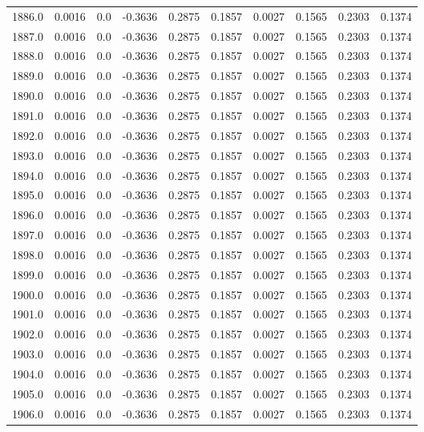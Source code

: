 \begin{longtable}{lrrrrrrrrr}
1886.0 & 0.0016 & 0.0 & -0.3636 & 0.2875 & 0.1857 & 0.0027 & 0.1565 & 0.2303 & 0.1374 \\
1887.0 & 0.0016 & 0.0 & -0.3636 & 0.2875 & 0.1857 & 0.0027 & 0.1565 & 0.2303 & 0.1374 \\
1888.0 & 0.0016 & 0.0 & -0.3636 & 0.2875 & 0.1857 & 0.0027 & 0.1565 & 0.2303 & 0.1374 \\
1889.0 & 0.0016 & 0.0 & -0.3636 & 0.2875 & 0.1857 & 0.0027 & 0.1565 & 0.2303 & 0.1374 \\
1890.0 & 0.0016 & 0.0 & -0.3636 & 0.2875 & 0.1857 & 0.0027 & 0.1565 & 0.2303 & 0.1374 \\
1891.0 & 0.0016 & 0.0 & -0.3636 & 0.2875 & 0.1857 & 0.0027 & 0.1565 & 0.2303 & 0.1374 \\
1892.0 & 0.0016 & 0.0 & -0.3636 & 0.2875 & 0.1857 & 0.0027 & 0.1565 & 0.2303 & 0.1374 \\
1893.0 & 0.0016 & 0.0 & -0.3636 & 0.2875 & 0.1857 & 0.0027 & 0.1565 & 0.2303 & 0.1374 \\
1894.0 & 0.0016 & 0.0 & -0.3636 & 0.2875 & 0.1857 & 0.0027 & 0.1565 & 0.2303 & 0.1374 \\
1895.0 & 0.0016 & 0.0 & -0.3636 & 0.2875 & 0.1857 & 0.0027 & 0.1565 & 0.2303 & 0.1374 \\
1896.0 & 0.0016 & 0.0 & -0.3636 & 0.2875 & 0.1857 & 0.0027 & 0.1565 & 0.2303 & 0.1374 \\
1897.0 & 0.0016 & 0.0 & -0.3636 & 0.2875 & 0.1857 & 0.0027 & 0.1565 & 0.2303 & 0.1374 \\
1898.0 & 0.0016 & 0.0 & -0.3636 & 0.2875 & 0.1857 & 0.0027 & 0.1565 & 0.2303 & 0.1374 \\
1899.0 & 0.0016 & 0.0 & -0.3636 & 0.2875 & 0.1857 & 0.0027 & 0.1565 & 0.2303 & 0.1374 \\
1900.0 & 0.0016 & 0.0 & -0.3636 & 0.2875 & 0.1857 & 0.0027 & 0.1565 & 0.2303 & 0.1374 \\
1901.0 & 0.0016 & 0.0 & -0.3636 & 0.2875 & 0.1857 & 0.0027 & 0.1565 & 0.2303 & 0.1374 \\
1902.0 & 0.0016 & 0.0 & -0.3636 & 0.2875 & 0.1857 & 0.0027 & 0.1565 & 0.2303 & 0.1374 \\
1903.0 & 0.0016 & 0.0 & -0.3636 & 0.2875 & 0.1857 & 0.0027 & 0.1565 & 0.2303 & 0.1374 \\
1904.0 & 0.0016 & 0.0 & -0.3636 & 0.2875 & 0.1857 & 0.0027 & 0.1565 & 0.2303 & 0.1374 \\
1905.0 & 0.0016 & 0.0 & -0.3636 & 0.2875 & 0.1857 & 0.0027 & 0.1565 & 0.2303 & 0.1374 \\
1906.0 & 0.0016 & 0.0 & -0.3636 & 0.2875 & 0.1857 & 0.0027 & 0.1565 & 0.2303 & 0.1374 \\

\end{longtable}
